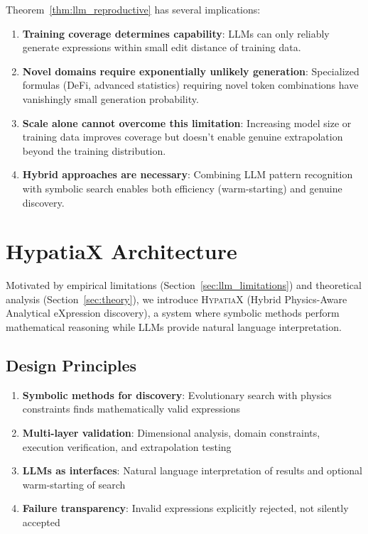 \documentclass[twoside,11pt]{article}
\begin{document}
Theorem~\ref{thm:llm_reproductive} has several implications:

\begin{enumerate}
\item \textbf{Training coverage determines capability}: LLMs can only reliably generate expressions within small edit distance of training data.

\item \textbf{Novel domains require exponentially unlikely generation}: Specialized formulas (DeFi, advanced statistics) requiring novel token combinations have vanishingly small generation probability.

\item \textbf{Scale alone cannot overcome this limitation}: Increasing model size or training data improves coverage but doesn't enable genuine extrapolation beyond the training distribution.

\item \textbf{Hybrid approaches are necessary}: Combining LLM pattern recognition with symbolic search enables both efficiency (warm-starting) and genuine discovery.
\end{enumerate}

\section{HypatiaX Architecture}
\label{sec:architecture}

Motivated by empirical limitations (Section~\ref{sec:llm_limitations}) and theoretical analysis (Section~\ref{sec:theory}), we introduce \textsc{HypatiaX} (Hybrid Physics-Aware Analytical eXpression discovery), a system where symbolic methods perform mathematical reasoning while LLMs provide natural language interpretation.

\subsection{Design Principles}

\begin{enumerate}
\item \textbf{Symbolic methods for discovery}: Evolutionary search with physics constraints finds mathematically valid expressions
\item \textbf{Multi-layer validation}: Dimensional analysis, domain constraints, execution verification, and extrapolation testing
\item \textbf{LLMs as interfaces}: Natural language interpretation of results and optional warm-starting of search
\item \textbf{Failure transparency}: Invalid expressions explicitly rejected, not silently accepted
\end{enumerate}
\end{document}
